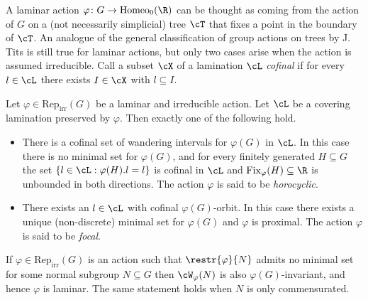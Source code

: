 \documentclass[reqno]{amsart}
\begin{document}
A laminar action $\varphi \colon G \to \mathrm{Homeo}_0(\R)$ can be thought as coming from the action of $G$ on a (not necessarily simplicial) tree $\cT$ that fixes a point in the boundary of $\cT$. An analogue of the general classification of group actions on trees by J. Tits \cite{Tits1970} is still true for laminar actions, but only two cases arise when the action is assumed irreducible. Call a subset $\cX$ of a lamination $\cL$ \emph{cofinal} if for every $l \in \cL$ there exists $I \in \cX$ with $l \subseteq I$.

\begin{prop}
Let $\varphi \in \mathrm{Rep}_\mathrm{irr}(G)$ be a laminar and irreducible action. Let $\cL$ be a covering lamination preserved by $\varphi$. Then exactly one of the following hold.
\begin{itemize}
        \item There is a cofinal set of wandering intervals for $\varphi(G)$ in $\cL$. In this case there is no minimal set for $\varphi(G)$, and for every finitely generated $H \subseteq G$ the set $\{l \in \cL : \varphi(H).l = l\}$ is cofinal in $\cL$ and $\mathrm{Fix}_\varphi(H) \subseteq \R$ is unbounded in both directions. The action $\varphi$ is said to be \emph{horocyclic}.
        \item There exists an $l \in \cL$ with cofinal $\varphi(G)$-orbit. In this case there exists a unique (non-discrete) minimal set for $\varphi(G)$ and $\varphi$ is proximal. The action $\varphi$ is said to be \emph{focal}.
\end{itemize}
\end{prop}

If $\varphi \in \mathrm{Rep}_\mathrm{irr}(G)$ is an action such that $\restr{\varphi}{N}$ admits no minimal set for some normal subgroup $N \subseteq G$ then $\cW_\varphi(N)$ is also $\varphi(G)$-invariant, and hence $\varphi$ is laminar. The same statement holds when $N$ is only commensurated.
\end{document}
